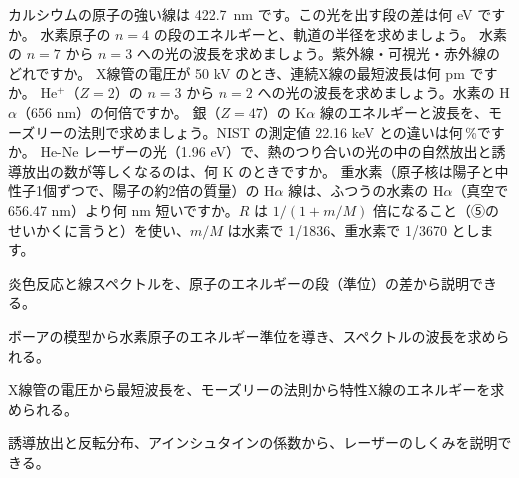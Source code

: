 \bkendproblems
{}
\bkproblem カルシウムの原子の強い線は \qty{422.7}{nm} です。この光を出す段の差は何 eV ですか。
\bkproblem 水素原子の $n=4$ の段のエネルギーと、軌道の半径を求めましょう。
\bkproblem 水素の $n=7$ から $n=3$ への光の波長を求めましょう。紫外線・可視光・赤外線のどれですか。
\bkproblem X線管の電圧が 50 kV のとき、連続X線の最短波長は何 pm ですか。
\bkproblem He$^{+}$（$Z=2$）の $n=3$ から $n=2$ への光の波長を求めましょう。水素の H$\alpha$（656 nm）の何倍ですか。
\bkproblem 銀（$Z=47$）の K$\alpha$ 線のエネルギーと波長を、モーズリーの法則で求めましょう。NIST の測定値 22.16 keV との違いは何\,\%ですか。
\bkproblem He-Ne レーザーの光（1.96 eV）で、熱のつり合いの光の中の自然放出と誘導放出の数が等しくなるのは、何 K のときですか。
\bkproblem 重水素（原子核は陽子と中性子1個ずつで、陽子の約2倍の質量）の H$\alpha$ 線は、ふつうの水素の H$\alpha$（真空で 656.47 nm）より何 nm 短いですか。$R$ は $1/(1+m/M)$ 倍になること（⑤のせいかくに言うと）を使い、$m/M$ は水素で 1/1836、重水素で 1/3670 とします。

\begin{furikaeri}
\begin{checklist}
\item 炎色反応と線スペクトルを、原子のエネルギーの段（準位）の差から説明できる。
\item ボーアの模型から水素原子のエネルギー準位を導き、スペクトルの波長を求められる。
\item X線管の電圧から最短波長を、モーズリーの法則から特性X線のエネルギーを求められる。
\item 誘導放出と反転分布、アインシュタインの係数から、レーザーのしくみを説明できる。
\end{checklist}
\end{furikaeri}
